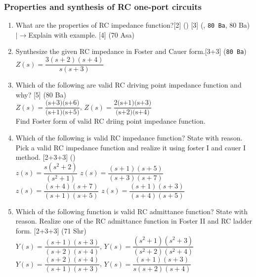 \documentclass[12pt]{article}
\newcommand{\lb}{\\$\left|\rightarrow\right.$}
\begin{document}
		\subsubsection{Properties and synthesis of RC one-port circuits}
			\begin{enumerate}
				\item What are the properties of RC impedance function?\hfill [2] () [3] (, \texttt{80 Ba}, 80 Ba)
				\lb Explain with example. \hfill [4] (70 Asa)
				
				\item Synthesize the given RC impedance in Foster and Cauer form.\hfill[3+3] (\texttt{80 Ba})\\
				$Z(s) = \dfrac{3(s+2)(s+4)}{s(s+3)}$
				
				\item Which of the following are valid RC driving point impedance function and why? \hfill [5] (80 Ba)\\
				$Z(s) = \dfrac{\text{(s+3)(s+6)}}{\text{(s+1)(s+5)}}$, \hspace{1cm} $Z(s) = \dfrac{\text{2(s+1)(s+3)}}{\text{(s+2)(s+4)}}$\\
				Find Foster form of valid RC driing point impedance function.
				
				\item Which of the following is valid RC impedance function? State with reason. Pick a valid RC impedance function and realize it using foster I and cauer I method. \hfill [2+3+3] ()\\
				$z(s) = \dfrac{s(s^2+2)}{(s^2+1)}$ \hspace{2.8cm}
				$z(s) = \dfrac{(s+1)(s+5)}{(s+3)(s+7)}$ \\
				$z(s) = \dfrac{(s+4)(s+7)}{(s+1)(s+5)}$ \hspace{2cm}
				$z(s) = \dfrac{(s+1)(s+3)}{(s+4)(s+5)}$ 
				
				\item Which of the following function is valid RC admittance function? State with reason. Realize one of the RC admittance function in Foster II and RC ladder form. \hfill [2+3+3] (71 Shr)\\
				$Y(s) = \dfrac{(s+1)(s+3)}{(s+2)(s+4)}$, \hspace{2cm}
				$Y(s) = \dfrac{(s^2+1)(s^2+3)}{(s^2+2)(s^2+4)}$\\
				$Y(s) = \dfrac{(s+2)(s+4)}{(s+1)(s+3)}$, \hspace{2cm}
				$Y(s) = \dfrac{(s+1)(s+3)}{s(s+2)(s+4)}$
			\end{enumerate}
\end{document}
